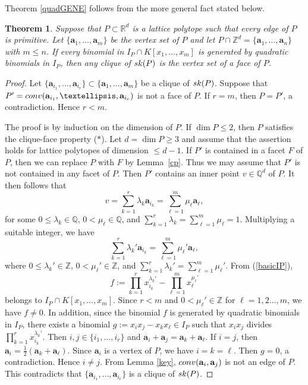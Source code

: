 \documentclass[10pt,a4paper]{amsart}
\newtheorem{thm}{Theorem} [section]
\numberwithin{thm}{section}
\numberwithin{equation}{section}
\def\NZQ{\mathbb}               %
\def\QQ{{\NZQ Q}}
\def\ZZ{{\NZQ Z}}
\def\RR{{\NZQ R}}
\def\ab{{\mathbf a}}
\begin{document}
Theorem \ref{quadGENE} follows from the more general fact stated below.

\begin{thm}\label{more general fact}
Suppose that  $P \subset \RR^d$ is a lattice polytope 
such that every edge of $P$ is primitive.
Let $\{\ab_1,\ldots,\ab_m\}$ be the vertex set of $P$ and let
$P \cap \ZZ^d = \{\ab_1,\ldots,\ab_n\}$ with $m \le n$.
If every binomial in $I_P \cap K[x_1,\dots,x_m]$ is generated by quadratic binomials in $I_P$, then any clique of ${\rm sk}(P)$ is the vertex set of a face of $P$.
\end{thm}

\begin{proof}
Let $\{\ab_{i_1} ,\dots,  \ab_{i_r}\} \subset \{\ab_1 ,\dots,  \ab_m\}$ be a clique 
of ${\rm sk}(P)$.
Suppose that 
$P'= {\rm conv}(\ab_{i_1} ,\dots,  \ab_{i_r})$ 
is not a face of $P$.
If $r=m$,
then 
$P=P'$,
a contradiction.
Hence $r<m$.

The proof is by induction on the dimension of $P$.
If $\dim P \le 2$, then $P$ satisfies the clique-face property ($*$).
Let $d=\dim P \ge 3$ and assume that the assertion holds for lattice polytopes of dimension $\le d-1$.
If $P'$ is contained in a facet $F$ of $P$,
then we can replace $P$ with $F$ by Lemma~\ref{cp}.
Thus we may assume that $P'$ is not contained in any facet of $P$.
Then $P'$ contains an inner point $v \in \QQ^d$ of $P$.
It then follows that
\[
v = \sum_{k=1}^r \lambda_k \ab_{i_k}
=\sum_{\ell=1}^m \mu_\ell \ab_\ell,
\]
for some $0 \leq \lambda_k \in \QQ$, $0 < \mu_\ell \in \QQ$,
and $\sum_{k=1}^r \lambda_k = \sum_{\ell=1}^m \mu_\ell = 1$.
Multiplying a suitable integer,
we have
\[
\sum_{k=1}^r \lambda_k' \ab_{i_k}
=\sum_{\ell=1}^m \mu_\ell' \ab_\ell,
\]
where 
$0 \leq \lambda_k' \in \ZZ$, $0 < \mu_\ell' \in \ZZ$,
and $\sum_{k=1}^r \lambda_k' = \sum_{\ell=1}^m \mu_\ell'$.
From (\ref{basicIP}),
    $$
    f:=
\prod_{k=1}^r x_{i_k}^{ \lambda_k'}
-
\prod_{\ell=1}^m x_\ell^{\mu_\ell'}  
$$
belongs to $I_P \cap K[x_1,\dots,x_m]$.
Since $r<m$ and $0 < \mu_\ell' \in \ZZ$ for $\ell = 1,2 \dots, m$, we have $f \ne 0$.
In addition, since the binomial $f$ is generated by quadratic binomials in $I_P$, there exists a binomial
$g:=x_i x_j - x_k x_\ell \in I_P$ 
such that $x_i x_j$ divides $\prod_{k=1}^r x_{i_k}^{ \lambda_k'}$.
Then $i,j \in \{i_1,\dots,i_r\}$
and $\ab_i + \ab_j = \ab_k + \ab_\ell$.
If $i = j$, then  $\ab_i  = \frac{1}{2}( \ab_k + \ab_\ell)$.
Since $\ab_i$ is a vertex of $P$, we have $i =k = \ell$.
Then $g = 0$, a contradiction.
Hence $i \ne j$.
From Lemma \ref{key},  ${\rm conv}(\ab_i , \ab_j)$ is not an edge of $P$.
This contradicts that
$\{\ab_{i_1} ,\dots,  \ab_{i_r}\}$ is a clique of ${\rm sk}(P)$.
\end{proof}
\end{document}
